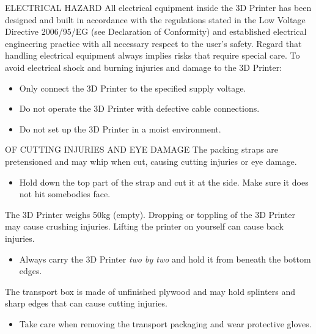 \begin{danger}
  ELECTRICAL HAZARD
  All electrical equipment inside the 3D Printer has been designed and built in accordance with the regulations stated in the Low Voltage Directive 2006/95/EG (see Declaration of Conformity) and established electrical engineering practice with all necessary respect to the user's safety.
  Regard that handling electrical equipment always implies risks that require special care.
  To avoid electrical shock and burning injuries and damage to the 3D Printer:
  \begin{itemize}  	
    \item Only connect the 3D Printer to the specified supply voltage.
    \item Do not operate the 3D Printer with defective cable connections.
    \item Do not set up the 3D Printer in a moist environment.
  \end{itemize}
\end{danger}

\begin{danger}
  OF CUTTING INJURIES AND EYE DAMAGE
  The packing straps are pretensioned and may whip when cut, causing cutting injuries or eye damage. 
  \begin{itemize} 
  	\item Hold down the top part of the strap and cut it at the side. 
  	      Make sure it does not hit somebodies face.  
  \end{itemize}
\end{danger}

\begin{danger}
  The 3D Printer weighs 50kg (empty). Dropping or toppling of the 3D Printer may cause crushing injuries. Lifting the printer on yourself can cause back injuries. 
  \begin{itemize} 
  	\item Always carry the 3D Printer \emph{two by two} and hold it from beneath the 
  	      bottom edges.
  \end{itemize}
\end{danger}

\begin{danger}
  The transport box is made of unfinished plywood and may hold splinters and sharp edges that can cause cutting injuries. 
  \begin{itemize} 
  	\item Take care when removing the transport packaging and wear protective 
  	      gloves. 
  \end{itemize}
\end{danger}

